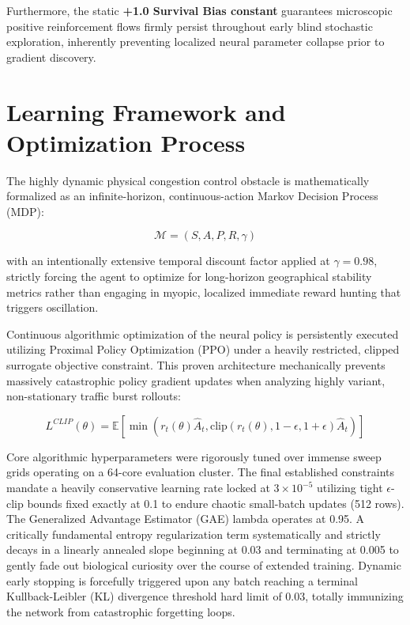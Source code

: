 \documentclass[12pt,a4paper]{article}
\begin{document}
Furthermore, the static \textbf{+1.0 Survival Bias constant} guarantees microscopic positive reinforcement flows firmly persist throughout early blind stochastic exploration, inherently preventing localized neural parameter collapse prior to gradient discovery.

\section{Learning Framework and Optimization Process}

The highly dynamic physical congestion control obstacle is mathematically formalized as an infinite-horizon, continuous-action Markov Decision Process (MDP):

\begin{equation}
\mathcal{M} = (S, A, P, R, \gamma)
\end{equation}

with an intentionally extensive temporal discount factor applied at $\gamma = 0.98$, strictly forcing the agent to optimize for long-horizon geographical stability metrics rather than engaging in myopic, localized immediate reward hunting that triggers oscillation.

Continuous algorithmic optimization of the neural policy is persistently executed utilizing Proximal Policy Optimization (PPO) under a heavily restricted, clipped surrogate objective constraint. This proven architecture mechanically prevents massively catastrophic policy gradient updates when analyzing highly variant, non-stationary traffic burst rollouts:

\begin{equation}
L^{CLIP}(\theta) =
\mathbb{E}\left[
\min(r_t(\theta)\hat{A}_t,\text{clip}(r_t(\theta),1-\epsilon,1+\epsilon)\hat{A}_t)
\right]
\end{equation}

Core algorithmic hyperparameters were rigorously tuned over immense sweep grids operating on a 64-core evaluation cluster. The final established constraints mandate a heavily conservative learning rate locked at $3 \times 10^{-5}$ utilizing tight $\epsilon$-clip bounds fixed exactly at 0.1 to endure chaotic small-batch updates (512 rows). The Generalized Advantage Estimator (GAE) lambda operates at 0.95. A critically fundamental entropy regularization term systematically and strictly decays in a linearly annealed slope beginning at 0.03 and terminating at 0.005 to gently fade out biological curiosity over the course of extended training. Dynamic early stopping is forcefully triggered upon any batch reaching a terminal Kullback-Leibler (KL) divergence threshold hard limit of 0.03, totally immunizing the network from catastrophic forgetting loops.
\end{document}
